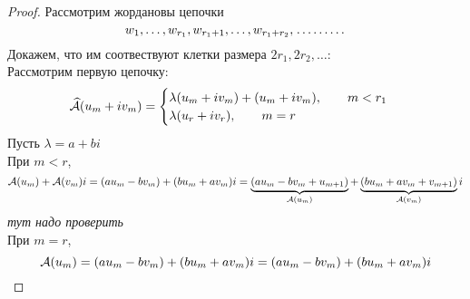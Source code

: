 \begin{proof}
	Рассмотрим жордановы цепочки
	$$ w_1, \dots, w_{r_1}, w_{r_1 + 1}, \dots, w_{r_1 + r_2}, \widedots[4em] $$
	Докажем, что им соотвествуют клетки размера $ 2r_1, 2r_2, \dots $: \\
	Рассмотрим первую цепочку:
	$$ \widehat{\mathcal{A}}(u_m + iv_m) =
	\begin{cases}
		\lambda(u_m + iv_m) + (u_m + iv_m), \qquad m < r_1 \\
		\lambda(u_r + iv_r), \qquad m = r
	\end{cases} $$
	Пусть $ \lambda = a + bi $ \\
	При $ m < r $,
	$$ \mathcal{A}(u_m) + \mathcal{A}(v_m)i = (au_m - bv_m) + (bu_m + av_m)i = \underbrace{(au_m - bv_m + u_{m + 1})}_{\mathcal{A}(u_m)} + \underbrace{(bu_m + av_m + v_{m + 1})}_{\mathcal{A}(v_m)}i $$
	\textit{тут надо проверить} \\
	При $ m = r $,
	$$ \mathcal{A}(u_m) = (au_m - bv_m) + (bu_m + av_m)i = (au_m - bv_m) + (bu_m + av_m)i $$
\end{proof}
